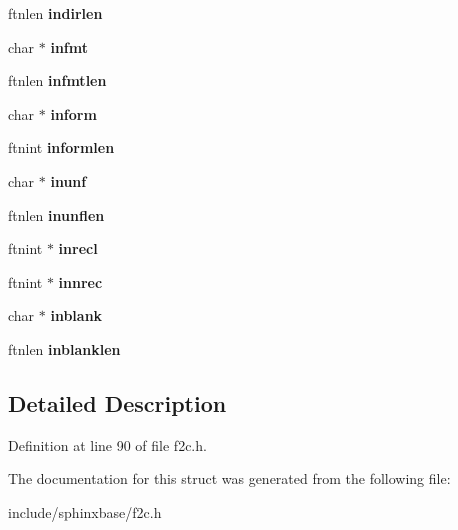\begin{DoxyCompactItemize}
\mbox{\label{structinlist_a17804ade39a70636a3f8ff551847b7b1}} 
ftnlen {\bfseries indirlen}
\item 
\mbox{\label{structinlist_a48b9f02a979e0e160e58e335e2c4ea9a}} 
char $\ast$ {\bfseries infmt}
\item 
\mbox{\label{structinlist_afbb4864f07c6e2c17d03cf936e6c1132}} 
ftnlen {\bfseries infmtlen}
\item 
\mbox{\label{structinlist_a990d5a197e15fce7513d83942602f08a}} 
char $\ast$ {\bfseries inform}
\item 
\mbox{\label{structinlist_aacc22fa1618d60aab28463a4d6b9dbe9}} 
ftnint {\bfseries informlen}
\item 
\mbox{\label{structinlist_af5807b5c897be8635d1bbca8c5cf9e39}} 
char $\ast$ {\bfseries inunf}
\item 
\mbox{\label{structinlist_a4a5e555086d129a2b8edc7d2ff3b3725}} 
ftnlen {\bfseries inunflen}
\item 
\mbox{\label{structinlist_ad11fedcf60bcfb643548dc8992f8774c}} 
ftnint $\ast$ {\bfseries inrecl}
\item 
\mbox{\label{structinlist_a0d5491f5ed82c5e4f787ac0411fd7600}} 
ftnint $\ast$ {\bfseries innrec}
\item 
\mbox{\label{structinlist_a3cbc44275b6c1cab2d1aad14af0b3318}} 
char $\ast$ {\bfseries inblank}
\item 
\mbox{\label{structinlist_a2aec2496017c66c3ba0d96adcb2b37a0}} 
ftnlen {\bfseries inblanklen}
\end{DoxyCompactItemize}


\subsection{Detailed Description}


Definition at line 90 of file f2c.\+h.



The documentation for this struct was generated from the following file\+:\begin{DoxyCompactItemize}
\item 
include/sphinxbase/f2c.\+h\end{DoxyCompactItemize}
